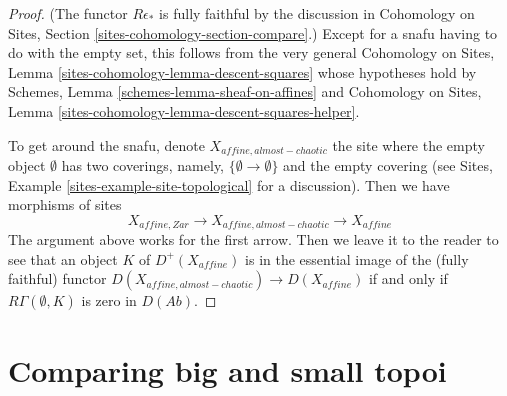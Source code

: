 \begin{proof}
(The functor $R\epsilon_*$ is fully faithful by the discussion in
Cohomology on Sites, Section \ref{sites-cohomology-section-compare}.)
Except for a snafu having to do with the empty set,
this follows from the very general Cohomology on Sites, Lemma
\ref{sites-cohomology-lemma-descent-squares} whose hypotheses hold by
Schemes, Lemma \ref{schemes-lemma-sheaf-on-affines} and
Cohomology on Sites, Lemma
\ref{sites-cohomology-lemma-descent-squares-helper}.

\medskip\noindent
To get around the snafu, denote $X_{affine, almost-chaotic}$
the site where the empty object $\emptyset$ has two coverings,
namely, $\{\emptyset \to \emptyset\}$ and the empty covering
(see Sites, Example \ref{sites-example-site-topological} for a
discussion). Then we have morphisms of sites
$$
X_{affine, Zar} \to X_{affine, almost-chaotic} \to X_{affine}
$$
The argument above works for the first arrow. Then we leave it
to the reader to see that an object $K$ of $D^+(X_{affine})$
is in the essential image of the (fully faithful) functor
$D(X_{affine, almost-chaotic}) \to D(X_{affine})$ if and only
if $R\Gamma(\emptyset, K)$ is zero in $D(\textit{Ab})$.
\end{proof}









\section{Comparing big and small topoi}
\label{section-compare}

